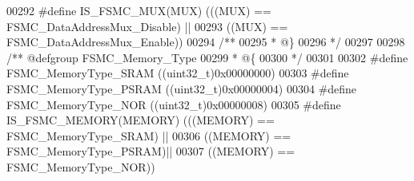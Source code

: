 \begin{DoxyCode}
00292 \textcolor{preprocessor}{#}\textcolor{preprocessor}{define} \textcolor{preprocessor}{IS\_FSMC\_MUX}\textcolor{preprocessor}{(}\textcolor{preprocessor}{MUX}\textcolor{preprocessor}{)} \textcolor{preprocessor}{(}\textcolor{preprocessor}{(}\textcolor{preprocessor}{(}\textcolor{preprocessor}{MUX}\textcolor{preprocessor}{)} \textcolor{preprocessor}{==} FSMC_DataAddressMux_Disable\textcolor{preprocessor}{)} \textcolor{preprocessor}{||}
00293                           \textcolor{preprocessor}{(}\textcolor{preprocessor}{(}\textcolor{preprocessor}{MUX}\textcolor{preprocessor}{)} \textcolor{preprocessor}{==} FSMC_DataAddressMux_Enable\textcolor{preprocessor}{)}\textcolor{preprocessor}{)}
00294 \textcolor{comment}{/**}
00295 \textcolor{comment}{  * @\}}
00296 \textcolor{comment}{  */}
00297 
00298 \textcolor{comment}{/** @defgroup FSMC\_Memory\_Type }
00299 \textcolor{comment}{  * @\{}
00300 \textcolor{comment}{  */}
00301 
00302 \textcolor{preprocessor}{#}\textcolor{preprocessor}{define} \textcolor{preprocessor}{FSMC\_MemoryType\_SRAM}                     \textcolor{preprocessor}{(}\textcolor{preprocessor}{(}\textcolor{preprocessor}{uint32\_t}\textcolor{preprocessor}{)}0x00000000\textcolor{preprocessor}{)}
00303 \textcolor{preprocessor}{#}\textcolor{preprocessor}{define} \textcolor{preprocessor}{FSMC\_MemoryType\_PSRAM}                    \textcolor{preprocessor}{(}\textcolor{preprocessor}{(}\textcolor{preprocessor}{uint32\_t}\textcolor{preprocessor}{)}0x00000004\textcolor{preprocessor}{)}
00304 \textcolor{preprocessor}{#}\textcolor{preprocessor}{define} \textcolor{preprocessor}{FSMC\_MemoryType\_NOR}                      \textcolor{preprocessor}{(}\textcolor{preprocessor}{(}\textcolor{preprocessor}{uint32\_t}\textcolor{preprocessor}{)}0x00000008\textcolor{preprocessor}{)}
00305 \textcolor{preprocessor}{#}\textcolor{preprocessor}{define} \textcolor{preprocessor}{IS\_FSMC\_MEMORY}\textcolor{preprocessor}{(}\textcolor{preprocessor}{MEMORY}\textcolor{preprocessor}{)} \textcolor{preprocessor}{(}\textcolor{preprocessor}{(}\textcolor{preprocessor}{(}\textcolor{preprocessor}{MEMORY}\textcolor{preprocessor}{)} \textcolor{preprocessor}{==} FSMC_MemoryType_SRAM\textcolor{preprocessor}{)} \textcolor{preprocessor}{||}
00306                                 \textcolor{preprocessor}{(}\textcolor{preprocessor}{(}\textcolor{preprocessor}{MEMORY}\textcolor{preprocessor}{)} \textcolor{preprocessor}{==} FSMC_MemoryType_PSRAM\textcolor{preprocessor}{)}\textcolor{preprocessor}{||}
00307                                 \textcolor{preprocessor}{(}\textcolor{preprocessor}{(}\textcolor{preprocessor}{MEMORY}\textcolor{preprocessor}{)} \textcolor{preprocessor}{==} FSMC_MemoryType_NOR\textcolor{preprocessor}{)}\textcolor{preprocessor}{)}

\end{DoxyCode}
